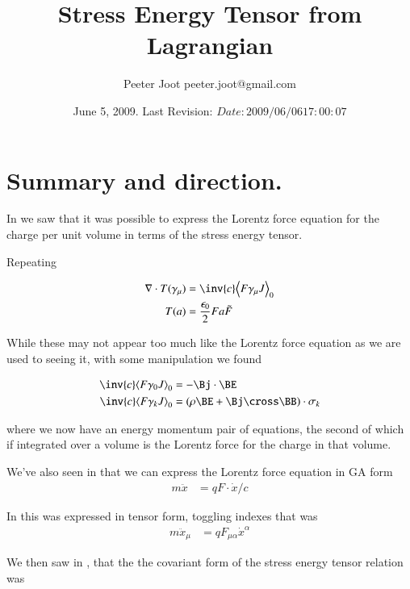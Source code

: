 \documentclass{article}
\title{Stress Energy Tensor from Lagrangian}\label{chap:stress_energy_noethers}
\author{Peeter Joot \quad peeter.joot@gmail.com }
\date{ June 5, 2009.  Last Revision: $Date: 2009/06/06 17:00:07 $ }
\begin{document}
\maketitle{}
\tableofcontents
\section{ Summary and direction. }

In 
\cite{PJstressEnergyLorentz} 
we saw that it was
possible to express the Lorentz force equation for the charge per unit
volume in terms of the stress energy tensor.

Repeating 

\begin{align}
\grad \cdot T(\gamma_\mu) &= \inv{c} \gpgradezero{ F \gamma_\mu J } \\
T(a) &= \frac{\epsilon_0}{2} F a \tilde{F}
\end{align}

While these
may not appear too much like the Lorentz force equation as we are used
to seeing it, with some manipulation we found 

\begin{align}
\inv{c} \gpgradezero{ F \gamma_0 J } &= -\Bj \cdot \BE \\
\inv{c} \gpgradezero{ F \gamma_k J } &= (\rho \BE + \Bj \cross \BB) \cdot \sigma_k
\end{align}

where we now have an energy momentum pair of equations, the second
of which if integrated over a volume is the Lorentz force for the charge
in that volume.

We've also seen in
that we can express the Lorentz force equation in GA form
\begin{align}
m \ddot{x} &= q F \cdot \dot{x}/c
\end{align}

In 
this was expressed in tensor form, toggling indexes that was
\begin{align}
m \ddot{x}_\mu &= {q} F_{\mu\alpha} \dot{x}^\alpha
\end{align}

We then saw in
\cite{PJenMtensor}
, that the
the covariant form of the stress energy tensor relation was
\end{document}

